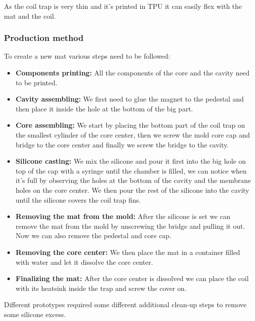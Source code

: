As the coil trap is very thin and it's printed in TPU it can easily flex with the mat and the coil.

\subsubsection{Production method}
To create a new mat various steps need to be followed:
\begin{itemize}
    \item \textbf{Components printing: } All the components of the core and the cavity need to be printed.
    \item \textbf{Cavity assembling: } We first need to glue the magnet to the pedestal and then place it inside the hole at the bottom of the big part.
    \item \textbf{Core assembling: } We start by placing the bottom part of the coil trap on the smallest cylinder of the core center, then we screw the mold core cap and bridge to the core center and finally we screw the bridge to the cavity.
    \item \textbf{Silicone casting: } We mix the silicone and pour it first into the big hole on top of the cap with a syringe until the chamber is filled, we can notice when it's full by observing the holes at the bottom of the cavity and the membrane holes on the core center.
    We then pour the rest of the silicone into the cavity until the silicone covers the coil trap fins.
    \item \textbf{Removing the mat from the mold: } After the silicone is set we can remove the mat from the mold by unscrewing the bridge and pulling it out.
    Now we can also remove the pedestal and core cap.
    \item \textbf{Removing the core center: } We then place the mat in a container filled with water and let it dissolve the core center.
    \item \textbf{Finalizing the mat: } After the core center is dissolved we can place the coil with its heatsink inside the trap and screw the cover on.
\end{itemize}
Different prototypes required some different additional clean-up steps to remove some silicone excess.

